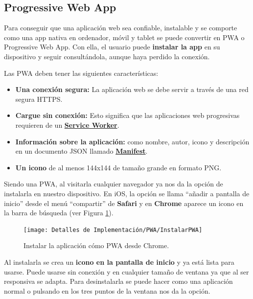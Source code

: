\documentclass[12pt,twoside,titlepage]{report}
\begin{document}
\subsection{Progressive Web App}

Para conseguir que una aplicación web sea confiable, instalable y se comporte como una app nativa en ordenador, móvil y tablet se puede convertir en PWA o Progressive Web App. Con ella, el usuario puede \textbf{instalar la app} en su dispositivo y seguir consultándola, aunque haya perdido la conexión.
\cite{pwa1}

Las PWA deben tener las siguientes características:

\begin{itemize}
    \item \textbf{Una conexión segura:} La aplicación web se debe servir a través de una red segura HTTPS.
    \item \textbf{Cargue sin conexión:} Esto significa que las aplicaciones web progresivas requieren de un \hyperref[sec:serviceWorker]{\textbf{Service Worker}}.
    \item \textbf{Información sobre la aplicación:} como nombre, autor, icono y descripción en un documento JSON llamado \hyperref[sec:manifest]{\textbf{Manifest}}.
    \item \textbf{Un icono} de al menos 144x144 de tamaño grande en formato PNG.
\end{itemize}

Siendo una PWA, al visitarla cualquier navegador ya nos da la opción de instalarla en nuestro dispositivo. En iOS, la opción se llama ``añadir a pantalla de inicio'' desde el menú ``compartir'' de \textbf{Safari} y en \textbf{Chrome} aparece un icono en la barra de búsqueda (ver Figura \ref{fig:InstalarPWA}).

\begin{figure}[H]
    \centering
    \texttt{[image: Detalles de Implementación/PWA/InstalarPWA]}
    \caption{Instalar la aplicación cómo PWA desde Chrome.}
    \label{fig:InstalarPWA}
\end{figure}

Al instalarla se crea un \textbf{icono en la pantalla de inicio} y ya está lista para usarse. Puede usarse sin conexión y en cualquier tamaño de ventana ya que al ser responsiva se adapta. Para desinstalarla se puede hacer como una aplicación normal o pulsando en los tres puntos de la ventana nos da la opción.

\end{document}
